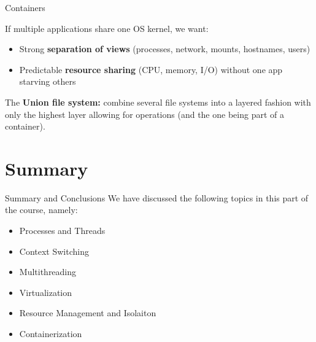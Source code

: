 \begin{frame}{Containers}
  \begin{centerfig}
  \end{centerfig}

  If multiple applications share one OS kernel, we want:
  \begin{itemize}
    \item Strong \textbf{separation of views} (processes, network, mounts, hostnames, users)
    \item Predictable \textbf{resource sharing} (CPU, memory, I/O) without one app starving others
  \end{itemize}

  The \textbf{Union file system:} combine several file systems into a layered fashion with only the highest
  layer allowing for  operations (and the one being part of a container).
\end{frame}

\section{Summary}
\begin{frame}{Summary and Conclusions}
  We have discussed the following topics in
  this part of the course, namely:
  \begin{itemize}
    \item Processes and Threads
    \item Context Switching
    \item Multithreading
    \item Virtualization
    \item Resource Management and Isolaiton
    \item Containerization
  \end{itemize}
\end{frame}
